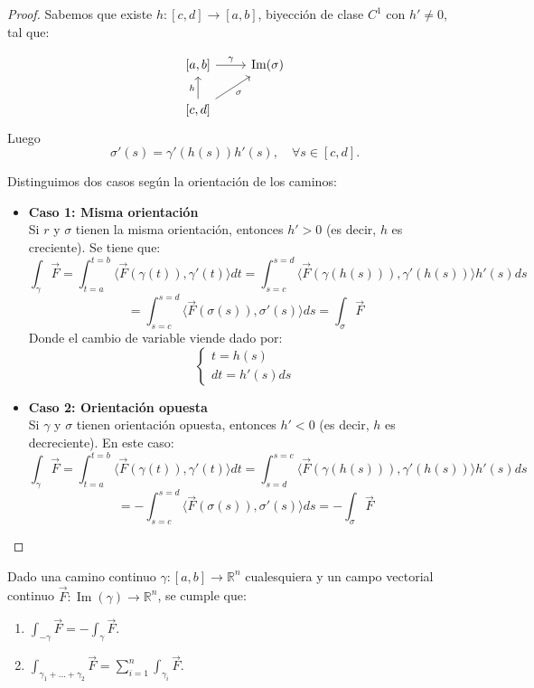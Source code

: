 \begin{proof}
    Sabemos que existe $h: [c,d] \to [a,b]$, biyección de clase $C^1$ con $h' \neq 0$, tal que:

    \[
        \begin{tikzcd}
            {[a,b]} \arrow[r, "\gamma"] & \operatorname{Im}(\sigma) \\
            {[c,d]} \arrow[u, "h"] \arrow[ur, "\sigma"']
        \end{tikzcd}
    \]
    Luego
    \[ \sigma'(s) = \gamma'(h(s)) h'(s), \quad \forall s \in [c,d]. \]

    Distinguimos dos casos según la orientación de los caminos:

    \begin{itemize}
        \item \textbf{Caso 1: Misma orientación}\\
              Si $r$ y $\sigma$ tienen la misma orientación, entonces $h' > 0$ (es decir, $h$ es creciente). Se tiene que:
              \[
                  \int_{\gamma} \vec{F} = \int_{t=a}^{t=b} \langle \vec{F} (\gamma (t)), \gamma'(t) \rangle dt = \int_{s=c}^{s=d} \langle \vec{F} (\gamma(h(s))), \gamma'(h(s)) \rangle h'(s) ds
              \]
              \[
                  = \int_{s=c}^{s=d} \langle \vec{F} (\sigma(s)), \sigma'(s) \rangle ds = \int_{\sigma} \vec{F}
              \]
              Donde el cambio de variable viende dado por:
              \[
                  \begin{cases}
                      t = h(s) \\
                      dt = h'(s) ds
                  \end{cases}
              \]
        \item \textbf{Caso 2: Orientación opuesta}\\
              Si $\gamma$ y $\sigma$ tienen orientación opuesta, entonces $h' < 0$ (es decir, $h$ es decreciente). En este caso:
              \[
                  \int_{\gamma} \vec{F} = \int_{t=a}^{t=b} \langle \vec{F} (\gamma(t)), \gamma'(t) \rangle dt = \int_{s=d}^{s=c} \langle \vec{F} (\gamma(h(s))), \gamma'(h(s)) \rangle h'(s) ds
              \]
              \[
                  = -\int_{s=c}^{s=d} \langle \vec{F} (\sigma(s)), \sigma'(s) \rangle ds = -\int_{\sigma} \vec{F}
              \]
    \end{itemize}
\end{proof}

\begin{observación}
Dado una camino continuo $\gamma : [a, b] \to \mathbb{R}^n$ cualesquiera y un campo vectorial continuo $\vec{F} : \operatorname{Im}(\gamma) \to \mathbb{R}^n$, se cumple que:
\vspace{-0.5em}
\begin{enumerate}
    \item $\int_{-\gamma} \vec{F} = -\int_{\gamma} \vec{F}$.
    \item $\int_{\gamma_1+\ldots+\gamma_2} \vec{F} = \sum_{i=1}^{n} \int_{\gamma_i} \vec{F}$.
\end{enumerate}
\end{observación}

